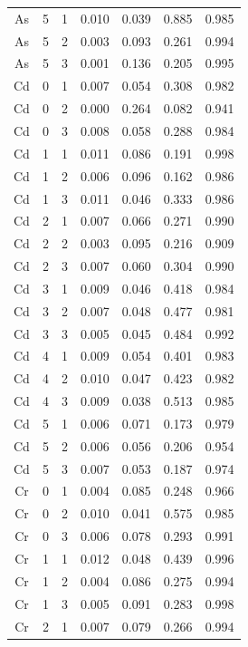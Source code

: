 \documentclass[ms, hidelinks]{uncgdissertationexp}
\theoremstyle{plain}
\theoremstyle{definition}
\theoremstyle{remark}
\begin{document}
\begin{longtable}{ccccccc}
As & 5 & 1 & 0.010 & 0.039 & 0.885 & 0.985\\
\rowcolor{gray!6}  As & 5 & 2 & 0.003 & 0.093 & 0.261 & 0.994\\
As & 5 & 3 & 0.001 & 0.136 & 0.205 & 0.995\\
\rowcolor{gray!6}  Cd & 0 & 1 & 0.007 & 0.054 & 0.308 & 0.982\\
Cd & 0 & 2 & 0.000 & 0.264 & 0.082 & 0.941\\
\rowcolor{gray!6}  Cd & 0 & 3 & 0.008 & 0.058 & 0.288 & 0.984\\
Cd & 1 & 1 & 0.011 & 0.086 & 0.191 & 0.998\\
\rowcolor{gray!6}  Cd & 1 & 2 & 0.006 & 0.096 & 0.162 & 0.986\\
Cd & 1 & 3 & 0.011 & 0.046 & 0.333 & 0.986\\
\rowcolor{gray!6}  Cd & 2 & 1 & 0.007 & 0.066 & 0.271 & 0.990\\
Cd & 2 & 2 & 0.003 & 0.095 & 0.216 & 0.909\\
\rowcolor{gray!6}  Cd & 2 & 3 & 0.007 & 0.060 & 0.304 & 0.990\\
Cd & 3 & 1 & 0.009 & 0.046 & 0.418 & 0.984\\
\rowcolor{gray!6}  Cd & 3 & 2 & 0.007 & 0.048 & 0.477 & 0.981\\
Cd & 3 & 3 & 0.005 & 0.045 & 0.484 & 0.992\\
\rowcolor{gray!6}  Cd & 4 & 1 & 0.009 & 0.054 & 0.401 & 0.983\\
Cd & 4 & 2 & 0.010 & 0.047 & 0.423 & 0.982\\
\rowcolor{gray!6}  Cd & 4 & 3 & 0.009 & 0.038 & 0.513 & 0.985\\
Cd & 5 & 1 & 0.006 & 0.071 & 0.173 & 0.979\\
\rowcolor{gray!6}  Cd & 5 & 2 & 0.006 & 0.056 & 0.206 & 0.954\\
Cd & 5 & 3 & 0.007 & 0.053 & 0.187 & 0.974\\
\rowcolor{gray!6}  Cr & 0 & 1 & 0.004 & 0.085 & 0.248 & 0.966\\
Cr & 0 & 2 & 0.010 & 0.041 & 0.575 & 0.985\\
\rowcolor{gray!6}  Cr & 0 & 3 & 0.006 & 0.078 & 0.293 & 0.991\\
Cr & 1 & 1 & 0.012 & 0.048 & 0.439 & 0.996\\
\rowcolor{gray!6}  Cr & 1 & 2 & 0.004 & 0.086 & 0.275 & 0.994\\
Cr & 1 & 3 & 0.005 & 0.091 & 0.283 & 0.998\\
\rowcolor{gray!6}  Cr & 2 & 1 & 0.007 & 0.079 & 0.266 & 0.994\\

\end{longtable}
\end{document}
